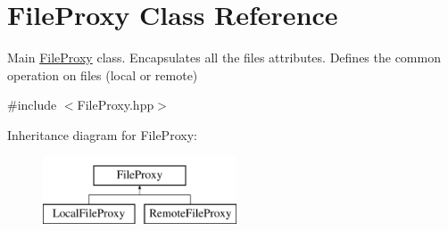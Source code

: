 \hypertarget{classFileProxy}{
\section{FileProxy Class Reference}
\label{classFileProxy}
}


Main \hyperlink{classFileProxy}{FileProxy} class. Encapsulates all the files attributes. Defines the common operation on files (local or remote)  




{\ttfamily \#include $<$FileProxy.hpp$>$}

Inheritance diagram for FileProxy:\begin{figure}[H]
\begin{center}
\leavevmode
\includegraphics[height=2.000000cm]{classFileProxy}
\end{center}
\end{figure}
